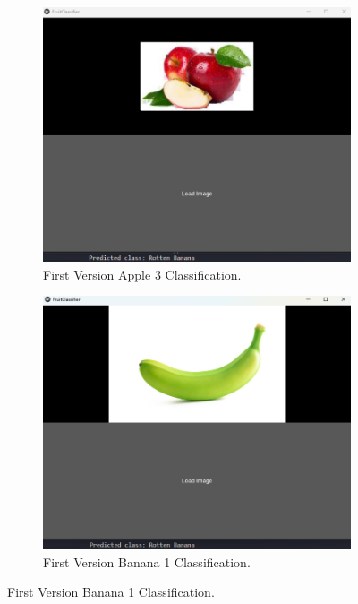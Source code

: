 \documentclass[conference]{IEEEtran}
\begin{document}
\begin{figure}[h]
\begin{subfigure}[b]{0.48\linewidth}
        \label{figFB}
    \end{subfigure}
    \hfill
    \begin{subfigure}[b]{0.48\linewidth}
        \centering
        \includegraphics[width=\linewidth]{1layer appel3.png}
        \caption{First Version Apple 3 Classification.}
        \label{figFB}
    \end{subfigure}
    \hfill
    \begin{subfigure}[b]{0.48\linewidth}
        \centering
        \includegraphics[width=\linewidth]{1layer banana1.png}
        \caption{First Version Banana 1 Classification.}

\end{subfigure}
\end{figure}
\end{document}
